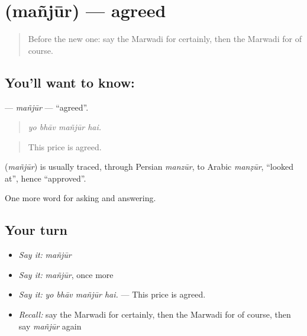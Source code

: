\section[\texorpdfstring{\mw{मंजूर} (mañjūr)}{मंजूर (mañjūr)}]{ (mañjūr) — agreed}

\label{lesson:MW-C272-manjur}



\begin{quote}
Before the new one: say the Marwadi for certainly, then the Marwadi for of course.
\end{quote}

\subsection*{You'll want to know: }
\textbf{} — \emph{mañjūr} — \textquotedblleft{}agreed\textquotedblright{}.

\begin{quote}
   
\end{quote}

\begin{quote}
\emph{yo bhāv mañjūr hai.}
\end{quote}

\begin{quote}
This price is agreed.
\end{quote}

\begin{cousinweb}
\textbf{} (\emph{mañjūr}) is usually traced, through Persian \emph{manzūr}, to Arabic \emph{manẓūr}, \textquotedblleft{}looked at\textquotedblright{}, hence \textquotedblleft{}approved\textquotedblright{}.
\end{cousinweb}

\begin{grammarlens}[title={What you've built}]
One more word for asking and answering.
\end{grammarlens}

\subsection*{Your turn}
\begin{itemize}
\raggedright
  \item \emph{Say it:} \emph{mañjūr}
  \item \emph{Say it:} \emph{mañjūr}, once more
  \item \emph{Say it:} \emph{yo bhāv mañjūr hai.} — This price is agreed.
  \item \emph{Recall:} say the Marwadi for certainly, then the Marwadi for of course, then say \emph{mañjūr} again
\end{itemize}

